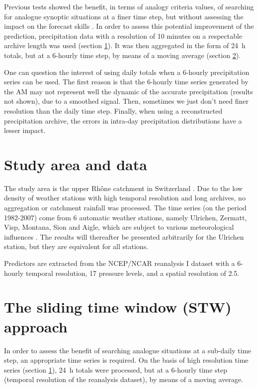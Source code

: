 \documentclass[hess]{copernicus}
\begin{document}
Previous tests showed the benefit, in terms of analogy criteria values, of searching for analogue synoptic situations at a finer time step, but without assessing the impact on the forecast skills \citep{Finet2008}. In order to assess this potential improvement of the prediction, precipitation data with a resolution of 10 minutes on a respectable archive length was used (section \ref{sec:data}). It was then aggregated in the form of 24~h totals, but at a 6-hourly time step, by means of a moving average (section \ref{sec:method}).

One can question the interest of using daily totals when a 6-hourly precipitation series can be used. The first reason is that the 6-hourly time series generated by the AM may not represent well the dynamic of the accurate precipitation (results not shown), due to a smoothed signal. Then, sometimes we just don't need finer resolution than the daily time step. Finally, when using a reconstructed precipitation archive, the errors in intra-day precipitation distributions have a lesser impact.


\section{Study area and data}
\label{sec:data}

The study area is the upper Rh\^{o}ne catchment in Switzerland \cite[study area of][]{Horton2012a}. Due to the low density of weather stations with high temporal resolution and long archives, no aggregation or catchment rainfall was processed. The time series (on the period 1982-2007) come from 6 automatic weather stations, namely Ulrichen, Zermatt, Visp, Montana, Sion and Aigle, which are subject to various meteorological influences \citep{Horton2012}. The results will thereafter be presented arbitrarily for the Ulrichen station, but they are equivalent for all stations.

Predictors are extracted from the NCEP/NCAR reanalysis I \citep{Kalnay1996} dataset with a 6-hourly temporal resolution, 17 pressure levels, and a spatial resolution of 2.5\degree.




\section{The sliding time window (STW) approach}
\label{sec:method}

In order to assess the benefit of searching analogue situations at a sub-daily time step, an appropriate time series is required. On the basis of high resolution time series (section \ref{sec:data}), 24~h totals were processed, but at a 6-hourly time step (temporal resolution of the reanalysis dataset), by means of a moving average. 
\end{document}
